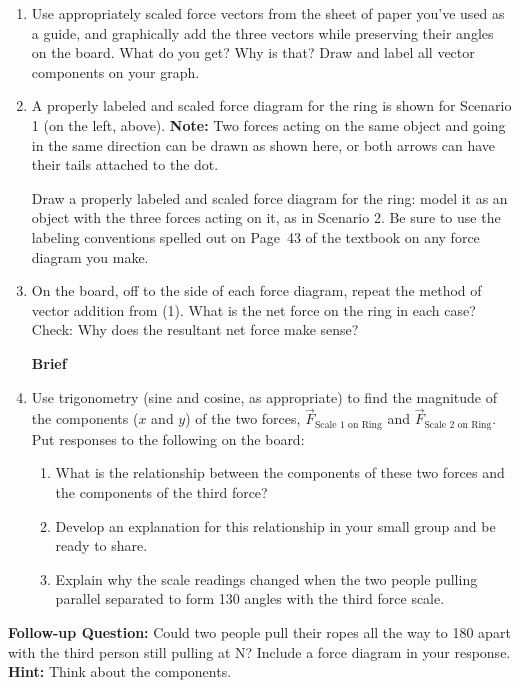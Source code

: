 \begin{enumerate}
	\item Use appropriately scaled force vectors from the sheet of paper you've used as a guide, and graphically add the three vectors while preserving their angles on the board. What do you get? Why is that? Draw and label all vector components on your graph.
	
	\item A properly labeled and scaled force diagram for the ring is shown for Scenario 1 (on the left, above). \textbf{Note:} Two forces acting on the same object and going in the same direction can be drawn as shown here, or both arrows can have their tails attached to the dot.
	
	Draw a properly labeled and scaled force diagram for the ring: model it as an object with the three forces acting on it, as in Scenario 2. Be sure to use the labeling conventions spelled out on Page~43 of the textbook on any force diagram you make.
	
	\item On the board, off to the side of each force diagram, repeat the method of vector addition from (1). What is the net force on the ring in each case? Check: Why does the resultant net force make sense?

\vspace{12pt}
\hspace{-\textwidth}\hspace{\linewidth} \textbf{Brief}
\hspace{\textwidth}\hspace{-\linewidth}
\WCD
	
	\item Use trigonometry (sine and cosine, as appropriate) to find the magnitude of the components ($x$ and $y$) of the two forces, $\vec{F}_\text{Scale 1 on Ring}$ and $\vec{F}_\text{Scale 2 on Ring}$. Put responses to the following on the board:
	\begin{enumerate}
		\item What is the relationship between the components of these two forces and the components of the third force?
		
		\item Develop an explanation for this relationship in your small group and be ready to share.
		
		\item Explain why the scale readings changed when the two people pulling parallel separated to form 130\textdegree{} angles with the third force scale.
	\end{enumerate}
\end{enumerate}

\WCD
\vspace{12pt}

\noindent \textbf{Follow-up Question:} Could two people pull their ropes all the way to 180\textdegree{} apart with the third person still pulling at \unit[30]{N}? Include a force diagram in your response. \textbf{Hint:} Think about the components.
 
\vspace{12pt}
\WCD
